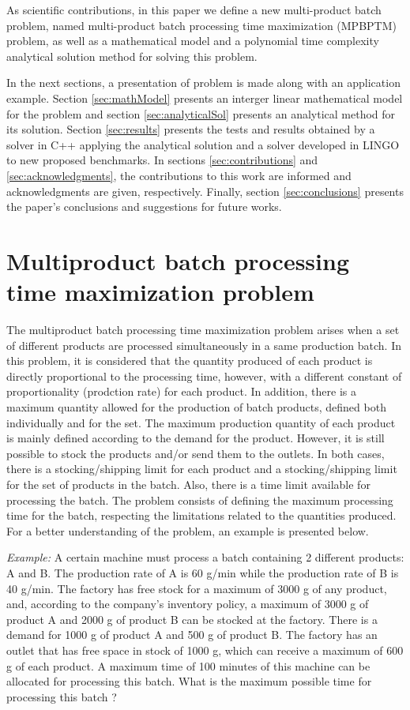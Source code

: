 \documentclass[authoryear,preprint,12pt]{elsarticle}
\begin{document}
As scientific contributions, in this paper we define a new multi-product batch problem, named multi-product batch processing time maximization (MPBPTM) problem, as well as a mathematical model and a polynomial time complexity analytical solution method for solving this problem.

In the next sections, a presentation of problem is made along with an application example. Section \ref{sec:mathModel} presents an interger linear mathematical model for the problem and section \ref{sec:analyticalSol} presents an analytical method for its solution. Section \ref{sec:results} presents the tests and results obtained by a solver in C++ applying the analytical solution and a solver developed in LINGO to new proposed benchmarks. In sections \ref{sec:contributions} and \ref{sec:acknowledgments}, the contributions to this work are informed and acknowledgments are given, respectively. Finally, section \ref{sec:conclusions} presents the paper's conclusions and suggestions for future works.

\section{Multiproduct batch processing time maximization problem}
\label{sec:MBPTMP}

The multiproduct batch processing time maximization problem arises when a set of different products are processed simultaneously in a same production batch. In this problem, it is considered that the quantity produced of each product is directly proportional to the processing time, however, with a different constant of proportionality (prodction rate) for each product. In addition, there is a maximum quantity allowed for the production of batch products, defined both individually and for the set. The maximum production quantity of each product is mainly defined according to the demand for the product. However, it is still possible to stock the products and/or send them to the outlets. In both cases, there is a stocking/shipping limit for each product and a stocking/shipping limit for the set of products in the batch. Also, there is a time limit available for processing the batch. The problem consists of defining the maximum processing time for the batch, respecting the limitations related to the quantities produced. For a better understanding of the problem, an example is presented below.

\emph{Example:} A certain machine must process a batch containing 2 different products: A and B. The production rate of A is 60 g/min while the production rate of B is 40 g/min. The factory has free stock for a maximum of 3000 g of any product, and, according to the company's inventory policy, a maximum of 3000 g of product A and 2000 g of product B can be stocked at the factory. There is a demand for 1000 g of product A and 500 g of product B. The factory has an outlet that has free space in stock of 1000 g, which can receive a maximum of 600 g of each product. A maximum time of 100 minutes of this machine can be allocated for processing this batch. What is the maximum possible time for processing this batch ? 
\end{document}
